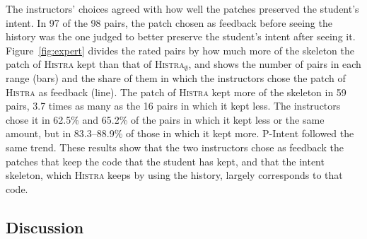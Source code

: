 \documentclass[10pt,conference]{IEEEtran}
\begin{document}
The instructors' choices agreed with how well the patches preserved the student's intent. In 97 of the 98 pairs, the patch chosen as feedback before seeing the history was the one judged to better preserve the student's intent after seeing it. Figure~\ref{fig:expert} divides the rated pairs by how much more of the skeleton the patch of \textsc{Histra} kept than that of \textsc{Histra}$_{\emptyset}$, and shows the number of pairs in each range (bars) and the share of them in which the instructors chose the patch of \textsc{Histra} as feedback (line). The patch of \textsc{Histra} kept more of the skeleton in 59 pairs, 3.7 times as many as the 16 pairs in which it kept less. The instructors chose it in 62.5\% and 65.2\% of the pairs in which it kept less or the same amount, but in 83.3--88.9\% of those in which it kept more. P-Intent followed the same trend. These results show that the two instructors chose as feedback the patches that keep the code that the student has kept, and that the intent skeleton, which \textsc{Histra} keeps by using the history, largely corresponds to that code.

\subsection{Discussion}\label{sec:discussion}
\end{document}
